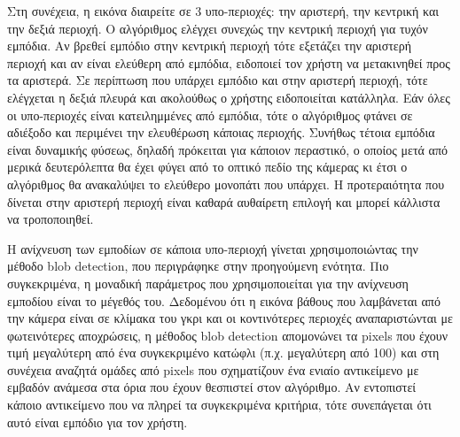 Στη συνέχεια, η εικόνα διαιρείτε σε 3 υπο-περιοχές: την αριστερή, την κεντρική και την δεξιά περιοχή. Ο αλγόριθμος ελέγχει συνεχώς την κεντρική περιοχή για τυχόν εμπόδια. Αν βρεθεί εμπόδιο στην κεντρική περιοχή τότε εξετάζει την αριστερή περιοχή και αν είναι ελεύθερη από εμπόδια, ειδοποιεί τον χρήστη να μετακινηθεί προς τα αριστερά. Σε περίπτωση που υπάρχει εμπόδιο και στην αριστερή περιοχή, τότε ελέγχεται η δεξιά πλευρά και ακολούθως ο χρήστης ειδοποιείται κατάλληλα. Εάν όλες οι υπο-περιοχές είναι κατειλημμένες από εμπόδια, τότε ο αλγόριθμος φτάνει σε αδιέξοδο και περιμένει την ελευθέρωση κάποιας περιοχής. Συνήθως τέτοια εμπόδια είναι δυναμικής φύσεως, δηλαδή πρόκειται για κάποιον περαστικό, ο οποίος μετά από μερικά δευτερόλεπτα θα έχει φύγει από το οπτικό πεδίο της κάμερας κι έτσι ο αλγόριθμος θα ανακαλύψει το ελεύθερο μονοπάτι που υπάρχει. Η προτεραιότητα που δίνεται στην αριστερή περιοχή είναι καθαρά αυθαίρετη επιλογή και μπορεί κάλλιστα να τροποποιηθεί.

Η ανίχνευση των εμποδίων σε κάποια υπο-περιοχή γίνεται χρησιμοποιώντας την μέθοδο blob detection, που περιγράφηκε στην προηγούμενη ενότητα. Πιο συγκεκριμένα, η μοναδική παράμετρος που χρησιμοποιείται για την ανίχνευση εμποδίου είναι το μέγεθός του. Δεδομένου ότι η εικόνα βάθους που λαμβάνεται από την κάμερα είναι σε κλίμακα του γκρι και οι κοντινότερες περιοχές αναπαριστώνται με φωτεινότερες αποχρώσεις, η μέθοδος blob detection απομονώνει τα pixels που έχουν τιμή μεγαλύτερη από ένα συγκεκριμένο κατώφλι (π.χ. μεγαλύτερη από 100) και στη συνέχεια αναζητά ομάδες από pixels που σχηματίζουν ένα ενιαίο αντικείμενο με εμβαδόν ανάμεσα στα όρια που έχουν θεσπιστεί στον αλγόριθμο. Αν εντοπιστεί κάποιο αντικείμενο που να πληρεί τα συγκεκριμένα κριτήρια, τότε συνεπάγεται ότι αυτό είναι εμπόδιο για τον χρήστη.

